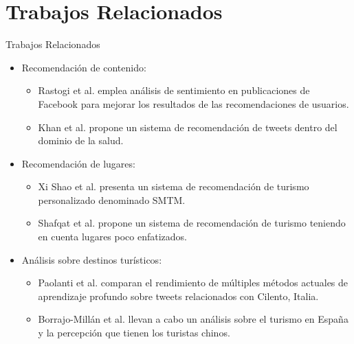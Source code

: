 \documentclass[aspectratio=149]{beamer}
\begin{document}
\section{Trabajos Relacionados}
\begin{frame}[label=relat]{Trabajos Relacionados}
    \begin{itemize}
        \item Recomendación de contenido:
        \begin{itemize}
            \item Rastogi et al. \cite{sent_analysis_facebook_user_recom} emplea análisis de sentimiento en publicaciones de Facebook para mejorar los resultados de las recomendaciones de usuarios.
            \item Khan et al. \cite{pers_tweet_recomendation} propone un sistema de recomendación de tweets dentro del dominio de la salud.
        \end{itemize}
        \item Recomendación de lugares:
        \begin{itemize}
            \item Xi Shao et al. \cite{8796367} presenta un sistema de recomendación de turismo personalizado denominado SMTM.
            \item Shafqat et al. \cite{recom_mech_under_emph} propone un sistema de recomendación de turismo teniendo en cuenta lugares poco enfatizados.
        \end{itemize}
        \item Análisis sobre destinos turísticos:
        \begin{itemize}
            \item Paolanti et al. \cite {tourism_dest_rec_geolocation} comparan el rendimiento de múltiples métodos actuales de aprendizaje profundo sobre tweets relacionados con Cilento, Italia.
            \item Borrajo-Millán et al. \cite{su13116015} llevan a cabo un análisis sobre el turismo en España y la percepción que tienen los turistas chinos.
        \end{itemize}
    \end{itemize}
\end{frame}

\end{document}
